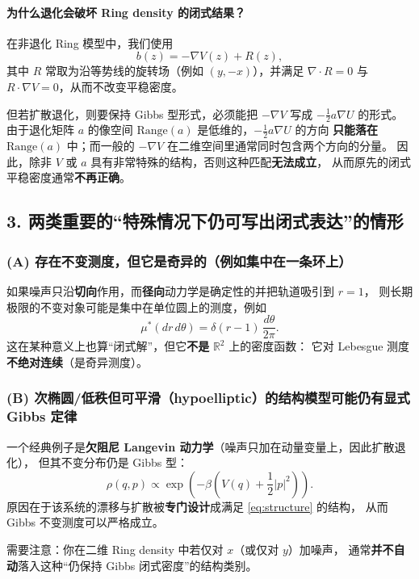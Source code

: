 	\paragraph{为什么退化会破坏 Ring density 的闭式结果？}
	在非退化 Ring 模型中，我们使用
	\[
	b(z)=-\nabla V(z)+R(z),
	\]
	其中 $R$ 常取为沿等势线的旋转场（例如 $(y,-x)$），并满足
	$\nabla\cdot R=0$ 与 $R\cdot \nabla V=0$，从而不改变平稳密度。
	
	但若扩散退化，则要保持 Gibbs 型形式，必须能把 $-\nabla V$ 写成 $-\frac12 a\nabla U$ 的形式。
	由于退化矩阵 $a$ 的像空间 $\mathrm{Range}(a)$ 是低维的，$-\frac12 a\nabla U$ 的方向
	\textbf{只能落在} $\mathrm{Range}(a)$ 中；而一般的 $-\nabla V$ 在二维空间里通常同时包含两个方向的分量。
	因此，除非 $V$ 或 $a$ 具有非常特殊的结构，否则这种匹配\textbf{无法成立}，
	从而原先的闭式平稳密度通常\textbf{不再正确}。
	
	\subsection{3. 两类重要的“特殊情况下仍可写出闭式表达”的情形}
	
	\subsubsection{(A) 存在不变测度，但它是奇异的（例如集中在一条环上）}
	
	如果噪声只沿\textbf{切向}作用，而\textbf{径向}动力学是确定性的并把轨道吸引到 $r=1$，
	则长期极限的不变对象可能是集中在单位圆上的测度，例如
	\[
	\mu^*(dr\,d\theta)=\delta(r-1)\,\frac{d\theta}{2\pi}.
	\]
	这在某种意义上也算“闭式解”，但它\textbf{不是} $\mathbb{R}^2$ 上的密度函数：
	它对 Lebesgue 测度\textbf{不绝对连续}（是奇异测度）。
	
	\subsubsection{(B) 次椭圆/低秩但可平滑（hypoelliptic）的结构模型可能仍有显式 Gibbs 定律}
	
	一个经典例子是\textbf{欠阻尼 Langevin 动力学}（噪声只加在动量变量上，因此扩散退化），
	但其不变分布仍是 Gibbs 型：
	\[
	\rho(q,p)\propto \exp\!\left(-\beta\left(V(q)+\frac12|p|^2\right)\right).
	\]
	原因在于该系统的漂移与扩散被\textbf{专门设计}成满足 \eqref{eq:structure} 的结构，
	从而 Gibbs 不变测度可以严格成立。
	
	需要注意：你在二维 Ring density 中若仅对 $x$（或仅对 $y$）加噪声，
	通常\textbf{并不自动}落入这种“仍保持 Gibbs 闭式密度”的结构类别。
	
